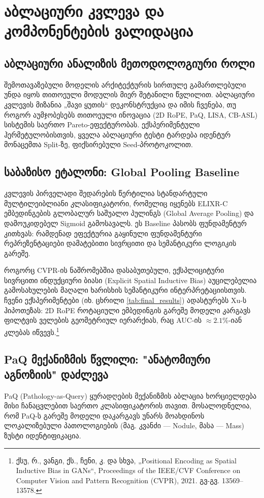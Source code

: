 \documentclass[12pt,a4paper,oneside]{report}
\begin{document}
\chapter{აბლაციური კვლევა და კომპონენტების ვალიდაცია}

\section{აბლაციური ანალიზის მეთოდოლოგიური როლი}
შემოთავაზებული მოდელის არქიტექტურის სირთულე გამართლებული უნდა იყოს თითოეული მოდულის მიერ შეტანილი წვლილით. აბლაციური კვლევის მიზანია „შავი ყუთის“ დეკონსტრუქცია და იმის ჩვენება, თუ როგორ აუმჯობესებს თითოეული ინოვაცია (2D RoPE, PaQ, LISA, CB-ASL) სისტემის საერთო Pareto-ეფექტურობას. ექსპერიმენტული ჰერმეტულობისთვის, ყველა აბლაციური ტესტი ტარდება იდენტურ მონაცემთა Split-ზე, ფიქსირებული Seed-პროტოკოლით.

\section{საბაზისო ეტალონი: Global Pooling Baseline}
კვლევის პირველადი შედარების წერტილია სტანდარტული მულტილეიბლიანი კლასიფიკატორი, რომელიც იყენებს ELIXR-C ემბედინგების გლობალურ საშუალო პულინგს (Global Average Pooling) და დამოუკიდებელ Sigmoid გამოსავალს. ეს Baseline პასობს ფუნდამენტურ კითხვას: რამდენად ეფექტურია გაყინული ფუნდამენტური რეპრეზენტაციები დამატებითი სივრცითი და სემანტიკური ლოგიკის გარეშე.

როგორც CVPR-ის ნაშრომებშია დასაბუთებული, ექსპლიციტური სივრცითი ინდუქციური ბიასი (Explicit Spatial Inductive Bias) აუცილებელია გამოსახულების მაღალი ხარისხის სემანტიკური ინტერპრეტაციისთვის. ჩვენი ექსპერიმენტები (იხ. ცხრილი \ref{tab:final_results}) ადასტურებს Xu-ს ჰიპოთეზას: 2D RoPE როტაციული ემბედინგის გარეშე მოდელი კარგავს ფილტვის ველების გეომეტრიულ იერარქიას, რაც AUC-ის $\approx 2.1\%$-იან კლებას იწვევს.\footnote{ქსუ, რ., ვანგი, ქს., ჩენი, კ. და სხვა, „Positional Encoding as Spatial Inductive Bias in GANs“, Proceedings of the IEEE/CVF Conference on Computer Vision and Pattern Recognition (CVPR), 2021. გვ-გვ. 13569–13578.}

\section{PaQ მექანიზმის წვლილი: "ანატომიური აგნოზიის" დაძლევა}
PaQ (Pathology-as-Query) ყურადღების მექანიზმის აბლაცია ხორციელდება მისი ჩანაცვლებით საერთო კლასიფიკატორის თავით. მოსალოდნელია, რომ PaQ-ს გარეშე მოდელი დაკარგავს უნარს მოახდინოს ლოკალიზებული პათოლოგიების (მაგ. კვანძი — Nodule, მასა — Mass) ზუსტი იდენტიფიკაცია. 
\end{document}
